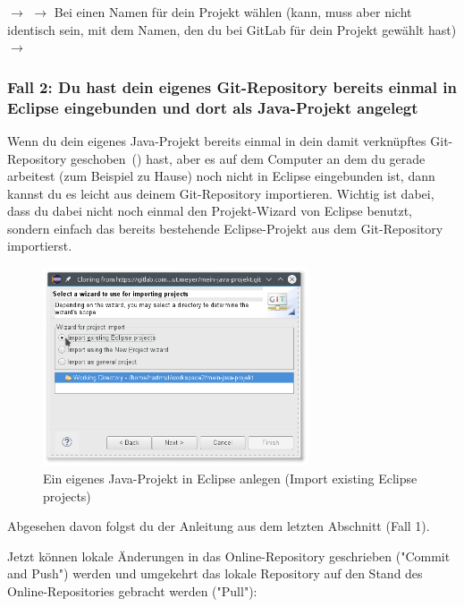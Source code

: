$\rightarrow$   $\rightarrow$ Bei  einen Namen
für dein Projekt wählen (kann, muss aber nicht identisch sein, mit dem Namen,
den du bei GitLab für dein Projekt gewählt hast)  $\rightarrow$

\afterpage{\clearpage}

\subsubsection{Fall 2: Du hast dein eigenes Git-Repository bereits einmal in
Eclipse eingebunden und dort als Java-Projekt angelegt}

Wenn du dein eigenes Java-Projekt bereits einmal in dein damit
verknüpftes Git-Repository \glqq geschoben\grqq\ () hast,
aber es auf dem Computer an dem du gerade arbeitest (zum Beispiel zu Hause) noch
nicht in Eclipse eingebunden ist, dann kannst du es leicht aus deinem
Git-Repository importieren. Wichtig ist dabei, dass du dabei nicht noch einmal
den Projekt-Wizard von Eclipse benutzt, sondern einfach das bereits bestehende
Eclipse-Projekt aus dem Git-Repository importierst. 

\begin{figure}[h]
  \centering
   \includegraphics[width=0.70\textwidth]{./inf/SEKII/01_Vorbereitung/Import_Project_from_Git_Import_Existing_Eclipse_Project.png}
   \caption{Ein eigenes Java-Projekt in Eclipse anlegen (Import existing Eclipse projects)}
   \label{fig:import-project-from-git-import-existing-project}
\end{figure}

Abgesehen davon folgst du der Anleitung aus dem letzten Abschnitt (Fall 1).

Jetzt können lokale Änderungen in das Online-Repository geschrieben ("Commit
and Push") werden und umgekehrt das lokale Repository auf den Stand des
Online-Repositories gebracht werden ("Pull"):

